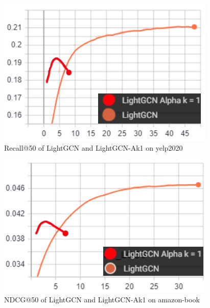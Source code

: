 \begin{figure}
    \includegraphics[width=\linewidth]{figures/alpha-k-results/yelp2020-recall.png}
    \caption{Recall@50 of LightGCN and LightGCN-Ak1 on yelp2020}
    \label{fig:recall-yelp2020-alpha-k}
\end{figure}
\begin{figure}
    \includegraphics[width=\linewidth]{figures/alpha-k-results/amazon-ndcg.png}
    \caption{NDCG@50 of LightGCN and LightGCN-Ak1 on amazon-book}
    \label{fig:ndcg-amazon-alpha-k}
\end{figure}
